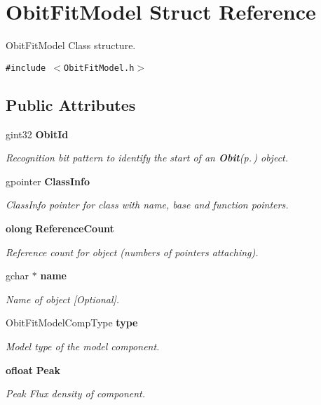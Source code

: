 \section{Obit\-Fit\-Model Struct Reference}
\label{structObitFitModel}
Obit\-Fit\-Model Class structure.  


{\tt \#include $<$Obit\-Fit\-Model.h$>$}

\subsection*{Public Attributes}
\begin{CompactItemize}
\item 
gint32 {\bf Obit\-Id}
\begin{CompactList}\small\item\em Recognition bit pattern to identify the start of an {\bf Obit}{\rm (p.\,\pageref{structObit})} object. \item\end{CompactList}\item 
gpointer {\bf Class\-Info}
\begin{CompactList}\small\item\em Class\-Info pointer for class with name, base and function pointers. \item\end{CompactList}\item 
{\bf olong} {\bf Reference\-Count}
\begin{CompactList}\small\item\em Reference count for object (numbers of pointers attaching). \item\end{CompactList}\item 
gchar $\ast$ {\bf name}
\begin{CompactList}\small\item\em Name of object [Optional]. \item\end{CompactList}\item 
Obit\-Fit\-Model\-Comp\-Type {\bf type}
\begin{CompactList}\small\item\em Model type of the model component. \item\end{CompactList}\item 
{\bf ofloat} {\bf Peak}
\begin{CompactList}\small\item\em Peak Flux density of component. \item\end{CompactList}\item 

\end{CompactItemize}
